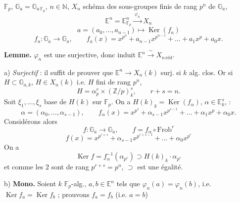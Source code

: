 \documentclass[11pt,a4paper]{article}
\begin{document}
$\mathbb{F}_p$, $\mathbb{G}_a = \mathbb{G}_{a\,\mathbb{F}_p}$, $n \in \mathbb{N}$,
$X_n$ schéma des sous-groupes finis de rang $p^n$ de $\mathbb{G}_a$,
\[
  \mathbb{E}^n = \mathbb{E}^n_{\mathbb{F}_p} \xrightarrow{\ \varphi_n\ } X_n
\]
\[
  a = (a_0, \dots, a_{n-1}) \longmapsto \operatorname{Ker}(f_a)
\]
\[
  f_a : \mathbb{G}_a \longrightarrow \mathbb{G}_a, \qquad
  f_a(x) = x^{p^n} + a_{n-1}x^{p^{n-1}} + \dots + a_1 x^p + a_0 x .
\]

\textbf{Lemme.} $\varphi_n$ est une \struck{\ill{}} 
surjective, donc induit $\mathbb{E}^n \xrightarrow{\ \sim\ } X_{n\,\mathrm{réd}}$.

a) \emph{Surjectif} : il suffit de prouver que
$\mathbb{E}^n \to X_n(k)$ surj. si $k$ alg. clos.
Or si $H \subset \mathbb{G}_{a,k}$, $H \in X_n(k)$ i.e. $H$ fini de rang $p^n$, \ill{}
\[
  H = \alpha_p^r \times (\mathbb{Z}/p)^s_k, \qquad r+s = n .
\]
Soit $\xi_1, \dots, \xi_s$ base de $H(k)$ sur $\mathbb{F}_p$.
On a $H(k)_k = \operatorname{Ker}(f_\alpha)$, $\alpha \in \mathbb{E}^s_k$,  :
\[
  \alpha = (\alpha_0, \dots, \alpha_{s-1}), \qquad
  f_\alpha(x) = x^{p^s} + \alpha_{s-1}x^{p^{s-1}} + \dots + \alpha_1 x^{p} + \alpha_0 x .
\]
Considérons alors
\[
  f : \mathbb{G}_a \longrightarrow \mathbb{G}_a, \qquad f = f_\alpha \circ \mathrm{Frob}^r
\]
\[
  f(x) = x^{p^{r+s}} + \alpha_{s-1} x^{p^{r+s-1}} + \dots + \alpha_0 x^{p^r}
\]
On a
\[
  \operatorname{Ker} f = f_\alpha^{-1}(\alpha_{p^r}) \supset H(k)_k \cdot \alpha_{p^r}
\]
et comme les $2$  sont de \ill{} rang $p^{r+s} = p^n$,
 $\supset$ est une égalité.

b) \textbf{Mono.} Soient \struck{\ill{}} $k$ $\mathbb{F}_p$-alg.,
$a, b \in \mathbb{E}^n$ tels que $\varphi_n(a) = \varphi_n(b)$, i.e.
$\operatorname{Ker} f_a = \operatorname{Ker} f_b$ ; prouvons $f_a = f_b$ (i.e. $a = b$)
\struck{\ill{}}

\end{document}

